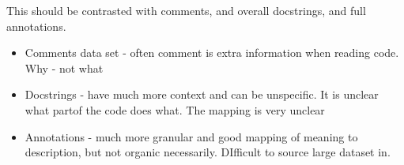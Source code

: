     This should be contrasted with comments, and overall docstrings, and full annotations.
    \begin{itemize}
        \item Comments data set - often comment is extra information when reading code. Why - not what
        \item Docstrings - have much more context and can be unspecific. It is unclear what partof the code does what. The mapping is very unclear
        \item Annotations - much more granular and good mapping of meaning to description, but not organic necessarily. DIfficult to source large dataset in.
    \end{itemize}


